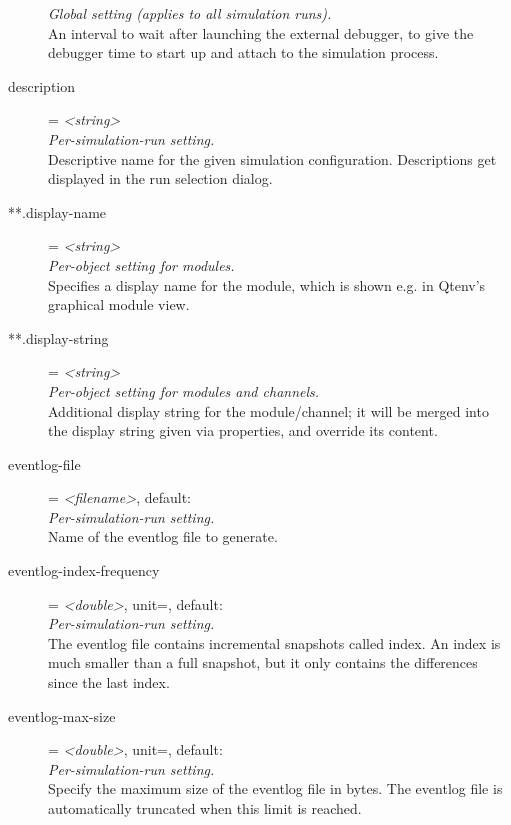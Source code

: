 \begin{description}
    \textit{Global setting (applies to all simulation runs).}\\
    An interval to wait after launching the external debugger, to give the
    debugger time to start up and attach to the simulation process.
\item[description] = \textit{<string>}\\
    \textit{Per-simulation-run setting.}\\
    Descriptive name for the given simulation configuration. Descriptions get
    displayed in the run selection dialog.
\item[**.display-name] = \textit{<string>}\\
    \textit{Per-object setting for modules.}\\
    Specifies a display name for the module, which is shown e.g. in Qtenv's
    graphical module view.
\item[**.display-string] = \textit{<string>}\\
    \textit{Per-object setting for modules and channels.}\\
    Additional display string for the module/channel; it will be merged into
    the display string given via  properties, and
    override its content.
\item[eventlog-file] = \textit{<filename>}, default: \\
    \textit{Per-simulation-run setting.}\\
    Name of the eventlog file to generate.
\item[eventlog-index-frequency] = \textit{<double>}, unit=, default: \\
    \textit{Per-simulation-run setting.}\\
    The eventlog file contains incremental snapshots called index. An index is
    much smaller than a full snapshot, but it only contains the differences
    since the last index.
\item[eventlog-max-size] = \textit{<double>}, unit=, default: \\
    \textit{Per-simulation-run setting.}\\
    Specify the maximum size of the eventlog file in bytes. The eventlog file
    is automatically truncated when this limit is reached.

\end{description}
